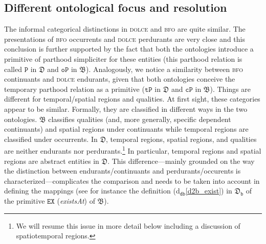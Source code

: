 \documentclass[ao]{iosart2x}
\newcommand{\dbDefLabel}{\textrm{d$_\texttt{db}$}}
\newcommand{\refdbdf}[1]{({\dbDefLabel}\ref{#1})}
\newcommand{\pr}[1]{\mathtt{#1}}
\newcommand{\cn}[1]{\mathtt{#1}}
\newcommand\textequal{%
 \rule[.08ex]{5pt}{0.35pt}\llap{\rule[.78ex]{5pt}{0.35pt}}}
\newcommand{\sdef}{{\hspace{1.5pt}:\hspace{-2.5pt}\textequal\hspace{3pt}}}
\newcommand{\dolce}{{\textsc{dolce}}}
\newcommand{\bfo}{{\textsc{bfo}}}
\newcommand {\thdolce} {\ensuremath{\mathfrak{D}}}
\newcommand {\thbfo} {\ensuremath{\mathfrak{B}}}
\newcommand {\thdolcedbmap} {\ensuremath{\mathfrak{D}_\texttt{b}}}
\newcommand {\TPd} {\ensuremath{\pr{tP}}}
\newcommand {\Pd} {\ensuremath{\pr{P}}}
\newcommand{\procbcat}{\cn{proc}}
\newcommand{\bfocpart}{\pr{cP}}
\newcommand{\bfoopart}{\pr{oP}}
\newcommand{\bfoexist}{\pr{EX}}
\newcommand{\bfoiof}[1]{{\,::_{#1\:\!}}}
\begin{document}
%


\subsection{Different ontological focus and resolution}\label{sect_diff_resolution}

The informal categorical distinctions in {\dolce} and {\bfo} are quite similar. The presentations of {\bfo} occurrents and {\dolce} perdurants are very close and this conclusion is further supported by the fact that both the ontologies introduce a primitive of parthood simpliciter for these entities (this parthood relation is called $\Pd$ in {$\thdolce$} and $\bfoopart$ in {$\thbfo$}). 
Analogously, we notice a similarity between {\bfo} continuants and {\dolce} endurants, given that both ontologies conceive the temporary parthood relation as a primitive ($\TPd$ in {$\thdolce$} and $\bfocpart$ in {$\thbfo$}).
Things are different for temporal/spatial  regions and qualities. At first sight, these categories appear to be similar. Formally, they are classified in different ways in the two ontologies. 
{$\thbfo$} classifies qualities (and, more generally, specific dependent continuants) and spatial regions under continuants while temporal regions are classified under occurrents. In {$\thdolce$}, temporal regions, spatial regions, and qualities are neither endurants nor perdurants.\footnote{We will resume this issue in more detail below including a discussion of spatiotemporal regions.} In particular, temporal regions and spatial regions are abstract entities in {$\thdolce$}. This difference---mainly grounded on the way the distinction between endurants/continuants  and perdurants/occurents is characterized---complicates the comparison and needs to be taken into account in defining the mappings (see for instance the definition \refdbdf{d2b_exist} in $\thdolcedbmap$ of the primitive $\bfoexist$ (\emph{existsAt}) of {$\thbfo$}).      
\end{document}
